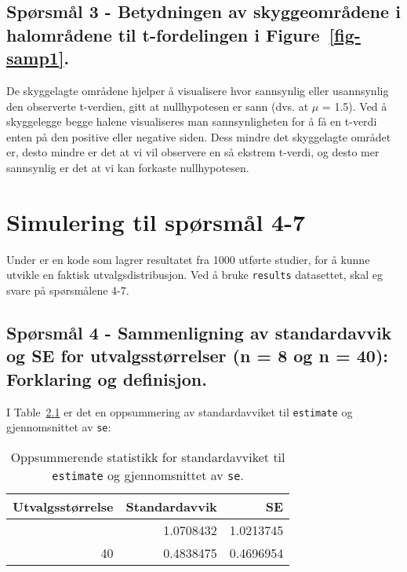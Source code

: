 \documentclass[
  letterpaper,
  DIV=11,
  numbers=noendperiod]{scrreprt}
\begin{document}
\section{\texorpdfstring{Spørsmål 3 - Betydningen av skyggeområdene i
halområdene til t-fordelingen i
Figure~\ref{fig-samp1}.}{Spørsmål 3 - Betydningen av skyggeområdene i halområdene til t-fordelingen i Figure~.}}\label{spuxf8rsmuxe5l-3---betydningen-av-skyggeomruxe5dene-i-halomruxe5dene-til-t-fordelingen-i-fig-samp1.}

De skyggelagte områdene hjelper å visualisere hvor sannsynlig eller
usannsynlig den observerte t-verdien, gitt at nullhypotesen er sann
(dvs. at \(\mu\) = 1.5). Ved å skyggelegge begge halene visualiseres man
sannsynligheten for å få en t-verdi enten på den positive eller negative
siden. Dess mindre det skyggelagte området er, desto mindre er det at vi
vil observere en så ekstrem t-verdi, og desto mer sannsynlig er det at
vi kan forkaste nullhypotesen.


\chapter{Simulering til spørsmål
4-7}\label{simulering-til-spuxf8rsmuxe5l-4-7}

Under er en kode som lagrer resultatet fra 1000 utførte studier, for å
kunne utvikle en faktisk utvalgsdistribusjon. Ved å bruke
\texttt{results} datasettet, skal eg svare på spørsmålene 4-7.

\section{Spørsmål 4 - Sammenligning av standardavvik og SE for
utvalgsstørrelser (n = 8 og n = 40): Forklaring og
definisjon.}\label{spuxf8rsmuxe5l-4---sammenligning-av-standardavvik-og-se-for-utvalgsstuxf8rrelser-n-8-og-n-40-forklaring-og-definisjon.}

I Table~\ref{tbl-summary} er det en oppsummering av standardavviket til
\texttt{estimate} og gjennomsnittet av \texttt{se}:

\begin{longtable}[]{@{}rrr@{}}

\caption{\label{tbl-summary}Oppsummerende statistikk for standardavviket
til \texttt{estimate} og gjennomsnittet av \texttt{se}.}

\tabularnewline

\toprule\noalign{}
Utvalgsstørrelse & Standardavvik & SE \\
\midrule\noalign{}
\endhead
\bottomrule\noalign{}
\endlastfoot
8 & 1.0708432 & 1.0213745 \\
40 & 0.4838475 & 0.4696954 \\

\end{longtable}
\end{document}
